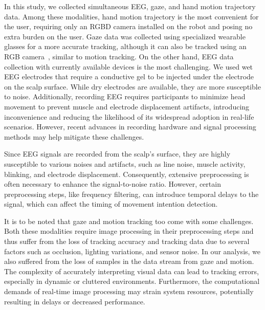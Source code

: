 In this study, we collected simultaneous EEG, gaze, and hand motion trajectory data. Among these modalities, hand motion trajectory is the most convenient for the user, requiring only an RGBD camera installed on the robot and posing no extra burden on the user. Gaze data was collected using specialized wearable glasses for a more accurate tracking, although it can also be tracked using an RGB camera~\cite{Open_gaze}, similar to motion tracking. On the other hand, EEG data collection with currently available devices is the most challenging. We used wet EEG electrodes that require a conductive gel to be injected under the electrode on the scalp surface. While dry electrodes are available, they are more susceptible to noise. Additionally, recording EEG requires participants to minimize head movement to prevent muscle and electrode displacement artifacts, introducing inconvenience and reducing the likelihood of its widespread adoption in real-life scenarios. However, recent advances in recording hardware and signal processing methods may help mitigate these challenges.

Since EEG signals are recorded from the scalp's surface, they are highly susceptible to various noises and artifacts, such as line noise, muscle activity, blinking, and electrode displacement. Consequently, extensive preprocessing is often necessary to enhance the signal-to-noise ratio. However, certain preprocessing steps, like frequency filtering, can introduce temporal delays to the signal, which can affect the timing of movement intention detection.

It is to be noted that gaze and motion tracking too come with some challenges. Both these modalities require image processing in their preprocessing steps and thus suffer from the loss of tracking accuracy and tracking data due to several factors such as occlusion, lighting variations, and sensor noise.
In our analysis, we also suffered from the loss of samples in the data stream from gaze and motion.
The complexity of accurately interpreting visual data can lead to tracking errors, especially in dynamic or cluttered environments. Furthermore, the computational demands of real-time image processing may strain system resources, potentially resulting in delays or decreased performance.

